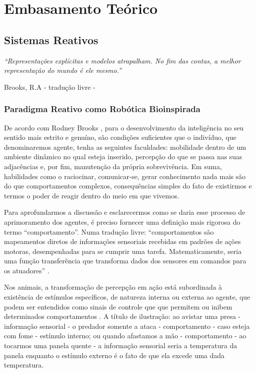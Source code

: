 \chapter{Embasamento Teórico}
\section{Sistemas Reativos}
\epigraph{ 
	  \textit{``Representações explícitas e modelos atrapalham. No fim das contas, a melhor representação do mundo é ele mesmo.''} 
	 }
	  { Brooks, R.A \cite{brooks} - tradução livre -} 
	  

\subsection{Paradigma Reativo como Robótica Bioinspirada} 

De acordo com Rodney Brooks \cite{brooks}, para o desenvolvimento da inteligência no seu sentido mais estrito e genuíno, são condições 
suficientes que o indivíduo, que denominaremos agente, tenha as seguintes faculdades: mobilidade dentro de um ambiente dinâmico no qual esteja 
inserido, percepção do que se passa nas suas adjacências e, por fim, manutenção da própria sobrevivência.
Em suma, habilidades como o raciocinar, comunicar-se, gerar conhecimento nada mais são do que comportamentos complexos, consequências simples do fato 
de existirmos e termos o poder de reagir dentro do meio em que vivemos.

Para aprofundarmos a discussão e esclarecermos como se daria esse processo de aprimoramento dos agentes, é preciso fornecer uma  definição 
mais rigorosa do termo ``comportamento''.
Numa tradução livre: ``comportamentos são mapeamentos diretos de informações sensoriais recebidas em  
padrões de ações motoras, desempenhadas para se cumprir uma tarefa. Matematicamente, seria uma função transferência que transforma dados dos 
sensores em comandos para os atuadores'' \cite{murphy}.

Nos animais, a transformação de percepção em ação está subordinada à existência de estímulos específicos, de natureza interna ou externa 
ao agente, que podem ser entendidos como sinais de controle que que permitem ou inibem determinados comportamentos \cite{murphy}.
A título de ilustração: ao avistar uma presa - informação sensorial - o predador somente a ataca - comportamento - caso esteja com fome - estímulo 
interno; ou quando afastamos a mão - comportamento - ao tocarmos uma panela quente - a informação sensorial seria a temperatura da panela enquanto o 
estímulo externo é o fato de que ela excede uma dada temperatura.

